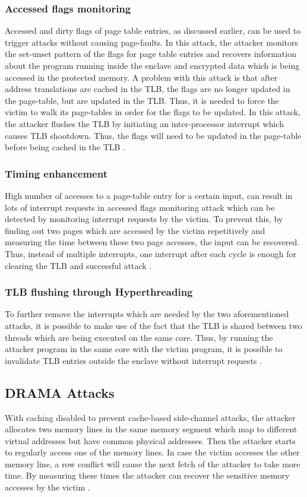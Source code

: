 \subsubsection{Accessed flags monitoring}
Accessed and dirty flags of page table entries, as discussed earlier, can be used to trigger attacks without causing page-faults. In this attack, the attacker monitors the set-unset pattern of the flags for page table entries and recovers information about the program running inside the enclave and encrypted data which is being accessed in the protected memory. A problem with this attack is that after address translations are cached in the TLB, the flags are no longer updated in the page-table, but are updated in the TLB. Thus, it is needed to force the victim to walk its page-tables in order for the flags to be updated. In this attack, the attacker flushes the TLB by initiating an inter-processor interrupt which causes TLB shootdown. Thus, the flags will need to be updated in the page-table before being cached in the TLB \cite{leakycauldron,stealthy}.
\subsubsection{Timing enhancement}
High number of accesses to a page-table entry for a certain input, can result in lots of interrupt requests in accessed flags monitoring attack which can be detected by monitoring interrupt requests by the victim. To prevent this, by finding out two pages which are accessed by the victim repetitively and measuring the time between these two page accesses, the input can be recovered. Thus, instead of multiple interrupts, one interrupt after each cycle is enough for clearing the TLB and successful attack \cite{leakycauldron,stealthy}.
\subsubsection{TLB flushing through Hyperthreading}
To further remove the interrupts which are needed by the two aforementioned attacks, it is possible to make use of the fact that the TLB is shared between two threads which are being executed on the same core. Thus, by running the attacker program in the same core with the victim program, it is possible to invalidate TLB entries outside the enclave without interrupt requests \cite{leakycauldron,stealthy}.

\subsection{DRAMA Attacks}
With caching disabled to prevent cache-based side-channel attacks, the attacker allocates two memory lines in the same memory segment which map to different virtual addresses but have common physical addresses. Then the attacker starts to regularly access one of the memory lines. In case the victim accesses the other memory line, a row conflict will cause the next fetch of the attacker to take more time. By measuring these times the attacker can recover the sensitive memory accesses by the victim \cite{leakycauldron,drama}.


